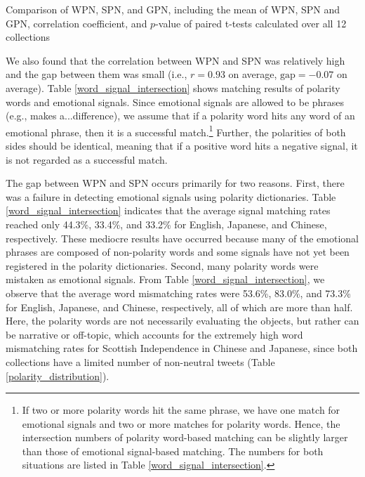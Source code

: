 \documentclass[english]{jnlp_1.4}
\begin{document}
\begin{table}[b]
\caption{Comparison of WPN, SPN, and GPN, including the mean of WPN, SPN and GPN, correlation coefficient, and $p$-value of paired t-tests calculated over all 12 collections}
\label{comparison_wpn_spn_gpn}

\end{table}

We also found that the correlation between WPN and SPN was relatively high and the gap between them was small (i.e., $r = 0.93$ on average, $\text{gap} = -0.07$ on average). Table \ref{word_signal_intersection} shows matching results of polarity words and emotional signals. Since emotional signals are allowed to be phrases (e.g., makes a...difference), we assume that if a polarity word hits any word of an emotional phrase, then it is a successful match.\footnote{If two or more polarity words hit the same phrase, we have one match for emotional signals and two or more matches for polarity words. Hence, the intersection numbers of polarity word-based matching can be slightly larger than those of emotional signal-based matching. The numbers for both situations are listed in Table \ref{word_signal_intersection}.} Further, the polarities of both sides should be identical, meaning that if a positive word hits a negative signal, it is not regarded as a successful match.

\begin{table}[t]
\label{word_signal_intersection}

\end{table}

The gap between WPN and SPN occurs primarily for two reasons. First, there was a failure in detecting emotional signals using polarity dictionaries. Table \ref{word_signal_intersection} indicates that the average signal matching rates reached only 44.3\%, 33.4\%, and 33.2\% for English, Japanese, and Chinese, respectively. These mediocre results have occurred because many of the emotional phrases are composed of non-polarity words and some signals have not yet been registered in the polarity dictionaries. Second, many polarity words were mistaken as emotional signals. From Table \ref{word_signal_intersection}, we observe that the average word mismatching rates were 53.6\%, 83.0\%, and 73.3\% for English, Japanese, and Chinese, respectively, all of which are more than half. Here, the polarity words are not necessarily evaluating the objects, but rather can be narrative or off-topic, which accounts for the extremely high word mismatching rates for Scottish Independence in Chinese and Japanese, since both collections have a limited number of non-neutral tweets (Table \ref{polarity_distribution}).
\end{document}
